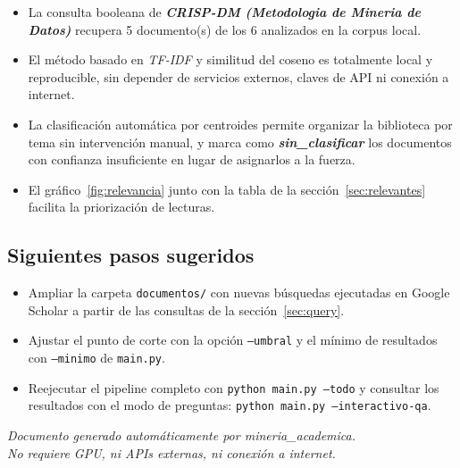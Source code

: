 \documentclass[11pt,a4paper]{article}
\newcommand{\tema}[1]{\textbf{\textit{#1}}}
\begin{document}
\begin{itemize}
\setlength{\itemsep}{4pt}
  \item La consulta booleana de \tema{ CRISP-DM (Metodologia de Mineria de Datos) } recupera
        5 documento(s) de los 6
        analizados en la corpus local.
  \item El método basado en \textit{TF-IDF} y similitud del coseno es
        totalmente local y reproducible, sin depender de servicios externos,
        claves de API ni conexión a internet.
  \item La clasificación automática por centroides permite organizar la
        biblioteca por tema sin intervención manual, y marca como
        \tema{sin\_clasificar} los documentos con confianza insuficiente en
        lugar de asignarlos a la fuerza.
  \item El gráfico~\ref{fig:relevancia} junto con la tabla de la
        sección~\ref{sec:relevantes} facilita la priorización de lecturas.
\end{itemize}

\subsection*{Siguientes pasos sugeridos}

\begin{itemize}
\setlength{\itemsep}{3pt}
  \item Ampliar la carpeta \texttt{documentos/} con nuevas búsquedas
        ejecutadas en Google Scholar a partir de las consultas de la
        sección~\ref{sec:query}.
  \item Ajustar el punto de corte con la opción \texttt{--umbral} y el mínimo
        de resultados con \texttt{--minimo} de \texttt{main.py}.
  \item Reejecutar el pipeline completo con \texttt{python main.py --todo}
        y consultar los resultados con el modo de preguntas:
        \texttt{python main.py --interactivo-qa}.
\end{itemize}

\vfill
\begin{center}
\small
\textit{Documento generado automáticamente por mineria\_academica.\\
No requiere GPU, ni APIs externas, ni conexión a internet.}
\end{center}
\end{document}
